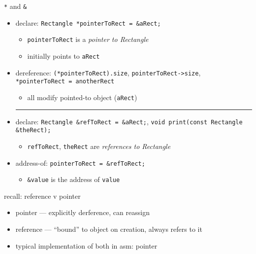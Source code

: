 \begin{frame}[fragile,label=starAndAmp]{\texttt{*} and \texttt{\&}}
\lstset{
    language=C++,
    style=small,
    morekeywords=Rectangle
}
\begin{itemize}
\item declare: \lstinline|Rectangle *pointerToRect = &aRect;|
    \begin{itemize}
    \item \texttt{pointerToRect} is a \textit{pointer to Rectangle}
    \item initially points to \lstinline|aRect|
    \end{itemize}
\item dereference: \lstinline|(*pointerToRect).size|, \lstinline|pointerToRect->size|, \lstinline|*pointerToRect = anotherRect|
    \begin{itemize}
    \item all modify pointed-to object (\lstinline|aRect|)
    \end{itemize}
\hrule
\item declare: \lstinline|Rectangle &refToRect = &aRect;|, \lstinline|void print(const Rectangle &theRect);|
    \begin{itemize}
    \item \texttt{refToRect}, \texttt{theRect} are \textit{references to Rectangle}
    \end{itemize}
\item address-of: \lstinline|pointerToRect = &refToRect;|
    \begin{itemize}
    \item \lstinline|&value| is the address of \lstinline|value|
    \end{itemize}
\end{itemize}
\end{frame}

\begin{frame}{recall: reference v pointer}
\begin{itemize}
\item pointer --- explicitly derference, can reassign
\item reference --- ``bound'' to object on creation, always refers to it
\vspace{.5cm}
\item typical implementation of both in asm: pointer
\end{itemize}
\end{frame}
